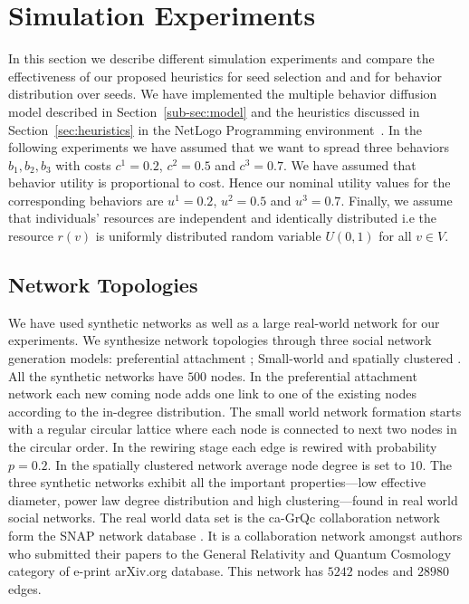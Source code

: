 \documentclass[letterpaper]{article}
\theoremstyle{plain} 		\newtheorem{thm}{Theorem}[section]
\theoremstyle{definition} 	\newtheorem{defn}[thm]{Definition}
\theoremstyle{remark}		\newtheorem{rem}{Remark}
\begin{document}
\section{Simulation Experiments} \label{sec:sim-exp}
In this section we describe different simulation experiments and compare the effectiveness of our proposed heuristics for seed selection and and for behavior distribution over seeds. We have implemented the multiple behavior diffusion model described in Section~\ref{sub-sec:model} and the heuristics discussed in Section~\ref{sec:heuristics} in the NetLogo Programming environment~\cite{Wilensky99}. In the following experiments we have assumed that we want to spread three behaviors ${b_1, b_2, b_3}$ with costs $c^1=0.2$, $c^2=0.5$ and $c^3=0.7$. We have assumed that behavior utility is proportional to cost. Hence our nominal utility values for the corresponding behaviors are $u^1=0.2$, $u^2=0.5$ and $u^3=0.7$. Finally, we assume that individuals' resources are independent and identically distributed i.e the resource $r(v)$ is uniformly distributed random variable $U(0,1)$ for all $v \in V$.

\subsection{Network Topologies}
We have used synthetic networks as well as a large real-world network for our experiments.  We synthesize network topologies through three social network generation models: preferential attachment \cite{barabasi99}; Small-world \cite{watts98} and spatially clustered \cite{Stonedahl08}. All the synthetic networks have $500$ nodes. In the preferential attachment network each new coming node adds one link to one of the existing nodes according to the in-degree distribution. The small world network formation starts with a regular circular lattice where each node is connected to next two nodes in the circular order. In the rewiring stage each edge is rewired with probability $p=0.2$. In the spatially clustered network average node degree is set to $10$. The three synthetic networks exhibit all the important properties---low effective diameter, power law degree distribution and high clustering---found in real world social networks. The real world data set is the ca-GrQc collaboration network form the SNAP network database \cite{Leskovec07a}. It is a collaboration network amongst authors who submitted their papers to the General Relativity and Quantum Cosmology category of e-print arXiv.org database. This network has $5242$ nodes and $28980$ edges.
\end{document}
